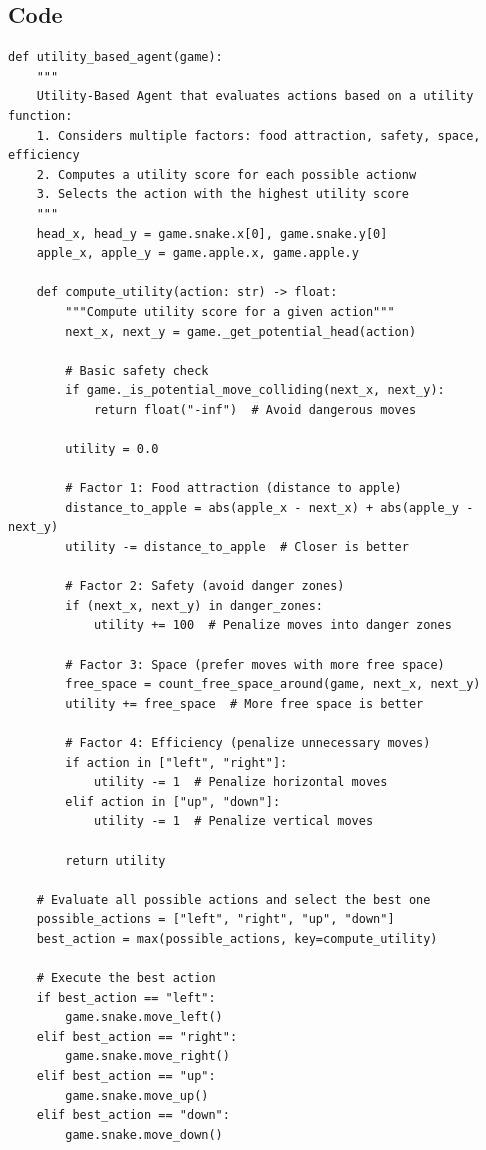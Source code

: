 \documentclass[11pt,a4paper]{article}
\begin{document}
\subsection{Code}
\begin{lstlisting}[caption=Utility-Based Agent]
def utility_based_agent(game):
    """
    Utility-Based Agent that evaluates actions based on a utility function:
    1. Considers multiple factors: food attraction, safety, space, efficiency
    2. Computes a utility score for each possible actionw
    3. Selects the action with the highest utility score
    """
    head_x, head_y = game.snake.x[0], game.snake.y[0]
    apple_x, apple_y = game.apple.x, game.apple.y

    def compute_utility(action: str) -> float:
        """Compute utility score for a given action"""
        next_x, next_y = game._get_potential_head(action)

        # Basic safety check
        if game._is_potential_move_colliding(next_x, next_y):
            return float("-inf")  # Avoid dangerous moves

        utility = 0.0

        # Factor 1: Food attraction (distance to apple)
        distance_to_apple = abs(apple_x - next_x) + abs(apple_y - next_y)
        utility -= distance_to_apple  # Closer is better

        # Factor 2: Safety (avoid danger zones)
        if (next_x, next_y) in danger_zones:
            utility += 100  # Penalize moves into danger zones

        # Factor 3: Space (prefer moves with more free space)
        free_space = count_free_space_around(game, next_x, next_y)
        utility += free_space  # More free space is better

        # Factor 4: Efficiency (penalize unnecessary moves)
        if action in ["left", "right"]:
            utility -= 1  # Penalize horizontal moves
        elif action in ["up", "down"]:
            utility -= 1  # Penalize vertical moves

        return utility

    # Evaluate all possible actions and select the best one
    possible_actions = ["left", "right", "up", "down"]
    best_action = max(possible_actions, key=compute_utility)

    # Execute the best action
    if best_action == "left":
        game.snake.move_left()
    elif best_action == "right":
        game.snake.move_right()
    elif best_action == "up":
        game.snake.move_up()
    elif best_action == "down":
        game.snake.move_down()
\end{lstlisting}
\end{document}
